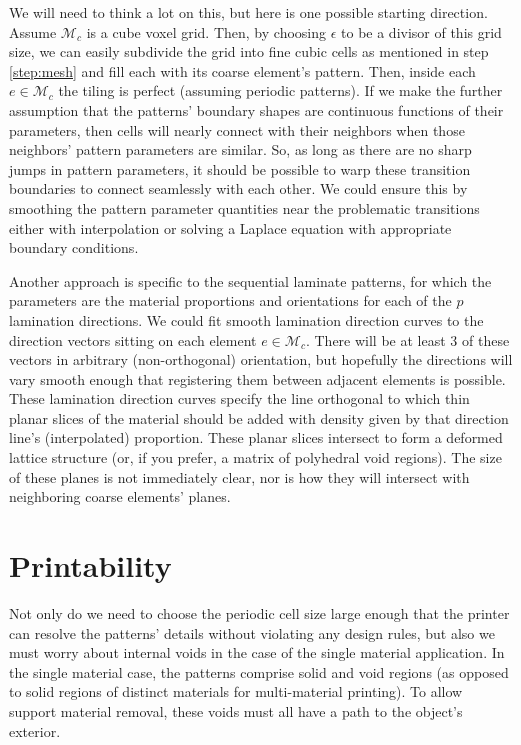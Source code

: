 \documentclass[10pt]{article}
\providecommand{\mesh}{\mathcal{M}}
\begin{document}
We will need to think a lot on this, but here is one possible starting
direction. Assume $\mesh_c$ is a cube voxel grid. Then, by choosing $\epsilon$
to be a divisor of this grid size, we can easily subdivide the grid into fine
cubic cells as mentioned in step \ref{step:mesh} and fill each with its coarse
element's pattern. Then, inside each $e \in \mesh_c$ the tiling is perfect
(assuming periodic patterns). If we make the further assumption that the
patterns' boundary shapes are continuous functions of their parameters, then
cells will nearly connect with their neighbors when those neighbors' pattern
parameters are similar. So, as long as there are no sharp jumps in pattern
parameters, it should be possible to warp these transition boundaries to connect
seamlessly with each other. We could ensure this by smoothing the pattern
parameter quantities near the problematic transitions either with interpolation
or solving a Laplace equation with appropriate boundary conditions.

Another approach is specific to the sequential laminate patterns, for which the
parameters are the material proportions and orientations for each of the $p$
lamination directions. We could fit smooth lamination direction curves to the
direction vectors sitting on each element $e \in \mesh_c$. There will be at
least $3$ of these vectors in arbitrary (non-orthogonal) orientation, but
hopefully the directions will vary smooth enough that registering them between
adjacent elements is possible. These lamination direction curves specify the
line orthogonal to which thin planar slices of the material should be added with
density given by that direction line's (interpolated) proportion. These planar
slices intersect to form a deformed lattice structure (or, if you prefer, a
matrix of polyhedral void regions). The size of these planes is not immediately
clear, nor is how they will intersect with neighboring coarse elements' planes.

\section{Printability}
Not only do we need to choose the periodic cell size large enough that the
printer can resolve the patterns' details without violating any design rules,
but also we must worry about internal voids in the case of the single material
application. In the single material case, the patterns comprise solid and void
regions (as opposed to solid regions of distinct materials for multi-material
printing). To allow support material removal, these voids must all have a path
to the object's exterior.
\end{document}
